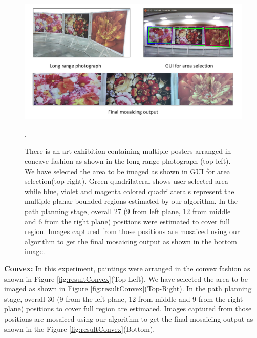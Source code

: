 \begin{figure}
\centering
\includegraphics[width=\linewidth]{figures/multiplanar/ConcaveResult.pdf}
\caption[Result: Concave arrangement]{There is an art exhibition containing
multiple posters arranged in concave fashion as shown in the long range photograph (top-left). We have
selected the area to be imaged as shown in GUI for area selection(top-right).
Green quadrilateral shows user selected area while blue, violet and magenta
colored quadrilaterals represent the multiple planar bounded regions
estimated by our algorithm. In the path planning stage, overall 27 (9 from left
plane, 12 from middle and 6 from the right plane) positions were estimated to cover
full region. Images captured from those positions are mosaiced using our algorithm
to get the final mosaicing output as shown in the bottom image.}
\label{fig:resultConcave}.
\end{figure}

\textbf{Convex:} In this experiment, paintings were arranged in the convex
fashion as shown in Figure \ref{fig:resultConvex}(Top-Left). We have selected
the area to be imaged as shown in Figure \ref{fig:resultConvex}(Top-Right). In
the path planning stage, overall 30 (9 from the left plane, 12 from middle and 9
from the right plane) positions to cover full region are estimated.  Images
captured from those positions are mosaiced using our algorithm to get the final
mosaicing output as shown in the Figure \ref{fig:resultConvex}(Bottom).

